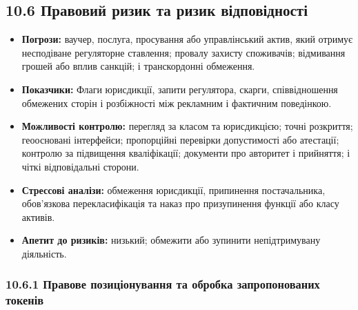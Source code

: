 \documentclass[11pt]{article}
\begin{document}
\subsection*{10.6 Правовий ризик та ризик відповідності}

\begin{itemize}[leftmargin=*]
\item \textbf{Погрози:} ваучер, послуга, просування або управлінський актив, який отримує несподіване регуляторне ставлення; провалу захисту споживачів; відмивання грошей або вплив санкцій; і транскордонні обмеження.
\item \textbf{Показчики:} Флаги юрисдикції, запити регулятора, скарги, співвідношення обмежених сторін і розбіжності між рекламним і фактичним поведінкою.
\item \textbf{Можливості контролю:} перегляд за класом та юрисдикцією; точні розкриття; геоосновані інтерфейси; пропорційні перевірки допустимості або атестації; контролю за підвищення кваліфікації; документи про авторитет і прийняття; і чіткі відповідальні сторони.
\item \textbf{Стрессові аналізи:} обмеження юрисдикції, припинення постачальника, обов'язкова перекласифікація та наказ про призупинення функції або класу активів.
\item \textbf{Апетит до ризиків:} низький; обмежити або зупинити непідтримувану діяльність.
\end{itemize}
\subsubsection*{10.6.1 Правове позиціонування та обробка запропонованих токенів}
\end{document}
